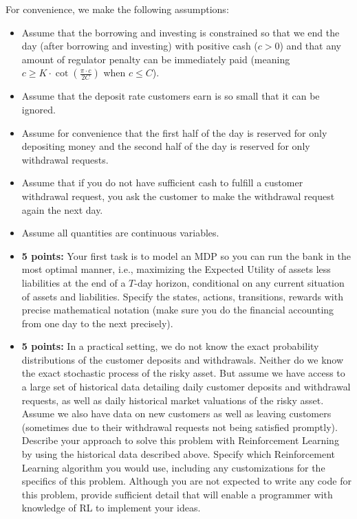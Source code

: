 \documentclass[12pt]{exam}
\begin{document}
\begin{questions}
For convenience, we make the following assumptions:
\begin{itemize}
\item  Assume that the borrowing and investing is constrained so that we end the day (after borrowing and investing) with positive cash ($c >  0$) and that any amount of regulator penalty can be immediately paid (meaning $c \geq K \cdot \cot(\frac {\pi \cdot c}{2C})$ when $c \leq C$).
\item Assume that the deposit rate customers earn is so small that it can be ignored.
\item Assume for convenience that the first half of the day is reserved for only depositing money and the second half of the day is reserved for only withdrawal requests.
\item Assume that if you do not have sufficient cash to fulfill a customer withdrawal request, you ask the customer to make the withdrawal request again the next day.
\item Assume all quantities are continuous variables.
\end{itemize}

\begin{itemize}
\item {\bf 5 points:} Your first task is to model an MDP so you can run the bank in the most optimal manner, i.e., maximizing the Expected Utility of assets less liabilities at the end of a $T$-day horizon, conditional on any current situation of assets and liabilities. Specify the states, actions, transitions, rewards with precise mathematical notation (make sure you do the financial accounting from one day to the next precisely).
\item {\bf 5 points:} In a practical setting, we do not know the exact probability distributions of the customer deposits and withdrawals. Neither do we know the exact stochastic process of the risky asset. But assume we have access to a large set of historical data detailing daily customer deposits and withdrawal requests, as well as daily historical market valuations of the risky asset. Assume we also have data on new customers as well as leaving customers (sometimes due to their withdrawal requests not being satisfied promptly). Describe your approach to solve this problem with Reinforcement Learning by using the historical data described above. Specify which Reinforcement Learning algorithm you would use, including any customizations for the specifics of this problem. Although you are not expected to write any code for this problem, provide sufficient detail that will enable a programmer with knowledge of RL to implement your ideas.
\end{itemize}


 
\end{questions}
\end{document}
